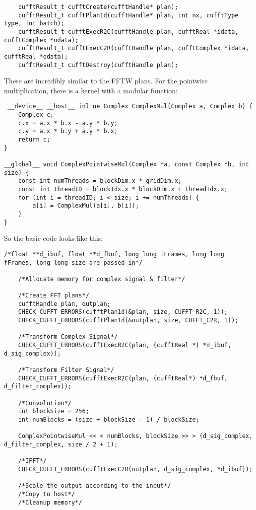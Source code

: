 \begin{verbatim}
    cufftResult_t cufftCreate(cufftHandle* plan);
    cufftResult_t cufftPlan1d(cufftHandle* plan, int nx, cufftType type, int batch);
    cufftResult_t cufftExecR2C(cufftHandle plan, cufftReal *idata, cufftComplex *odata);
    cufftResult_t cufftExecC2R(cufftHandle plan, cufftComplex *idata, cufftReal *odata);
    cufftResult_t cufftDestroy(cufftHandle plan);
\end{verbatim}

These are incredibly similar to the FFTW plans. For the pointwise multiplication, there is a kernel with a modular function:

\begin{verbatim}
 __device__ __host__ inline Complex ComplexMul(Complex a, Complex b) {
	Complex c;
	c.x = a.x * b.x - a.y * b.y;
	c.y = a.x * b.y + a.y * b.x;
	return c;
}

__global__ void ComplexPointwiseMul(Complex *a, const Complex *b, int size) {
	const int numThreads = blockDim.x * gridDim.x;
	const int threadID = blockIdx.x * blockDim.x + threadIdx.x;
	for (int i = threadID; i < size; i += numThreads) {
		a[i] = ComplexMul(a[i], b[i]);
	}
}
\end{verbatim}

So the basic code looks like this: 

\begin{verbatim}
/*float **d_ibuf, float **d_fbuf, long long iFrames, long long fFrames, long long size are passed in*/
    
    /*Allocate memory for complex signal & filter*/

    /*Create FFT plans*/
    cufftHandle plan, outplan;
    CHECK_CUFFT_ERRORS(cufftPlan1d(&plan, size, CUFFT_R2C, 1));
    CHECK_CUFFT_ERRORS(cufftPlan1d(&outplan, size, CUFFT_C2R, 1));

    /*Transform Complex Signal*/
    CHECK_CUFFT_ERRORS(cufftExecR2C(plan, (cufftReal *) *d_ibuf, d_sig_complex));

    /*Transform Filter Signal*/
    CHECK_CUFFT_ERRORS(cufftExecR2C(plan, (cufftReal*) *d_fbuf, d_filter_complex));

    /*Convolution*/
    int blockSize = 256;
    int numBlocks = (size + blockSize - 1) / blockSize;
	
    ComplexPointwiseMul << < numBlocks, blockSize >> > (d_sig_complex, d_filter_complex, size / 2 + 1);

    /*IFFT*/
    CHECK_CUFFT_ERRORS(cufftExecC2R(outplan, d_sig_complex, *d_ibuf));
    
    /*Scale the output according to the input*/
    /*Copy to host*/
    /*Cleanup memory*/
\end{verbatim}
